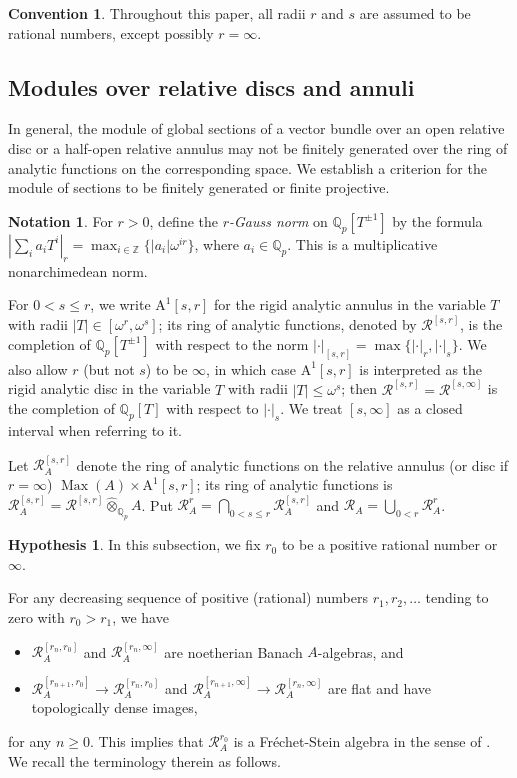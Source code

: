 \documentclass[12pt]{article}
\theoremstyle{definition}
\newtheorem{hypothesis}[theorem]{Hypothesis}
\newtheorem{convention}[theorem]{Convention}
\newtheorem{notation}[theorem]{Notation}
\numberwithin{equation}{theorem}
\newcommand{\calR}{\mathcal{R}}
\newcommand{\QQ}{\mathbb{Q}}
\newcommand{\ZZ}{\mathbb{Z}}
\newcommand{\rmA}{\mathrm{A}}
\def\Qp{\QQ_p}
\DeclareMathOperator{\Max}{Max}
\begin{document}
\begin{convention}
Throughout this paper, all radii $r$ and $s$ are assumed to be
rational numbers, except possibly $r=\infty$.
\end{convention}


\subsection{Modules over relative discs and annuli}
\label{S:half-open}
In general, the module of global sections of a vector bundle over an open relative disc or a half-open relative annulus may not be finitely generated over the ring of analytic functions on the corresponding space.  We establish a criterion for the module of sections to be finitely generated or finite projective.


\begin{notation}
For $r>0$, define the \emph{$r$-Gauss norm} on $\Qp[T^{\pm1}]$ by the formula $\left|\sum_i a_iT^i\right|_r = \max_{i\in\ZZ} \{|a_i| \omega^{ir}\}$, where $a_i \in \Qp$.  This is a multiplicative nonarchimedean norm.

For $0 < s \leq r$, we write $\rmA^1[s,r]$ for the rigid analytic
annulus in the variable $T$ with radii $|T| \in [\omega^r, \omega^s]$;
its ring of analytic functions, denoted by $\calR^{[s,r]}$, is the
completion of $\Qp[T^{\pm1}]$ with respect to the norm
$|\cdot|_{[s,r]} = \max\{|\cdot|_r, |\cdot|_s\}$.  We also allow $r$
(but not $s$) to be $\infty$, in which case $\rmA^1[s,r]$ is
interpreted as the rigid analytic disc in the variable $T$ with radii
$|T| \leq \omega^s$; then $\calR^{[s,r]} = \calR^{[s, \infty]}$ is the
completion of $\Qp[T]$ with respect to $|\cdot|_s$.  We treat
$[s,\infty]$ as a closed interval when referring to it.

Let $\calR_A^{[s,r]}$ denote the ring of analytic functions on the relative annulus (or disc if $r=\infty$) $\Max(A) \times \rmA^1[s,r]$; its ring of analytic functions is $\calR_A^{[s,r]} = \calR^{[s,r]} \widehat \otimes_{\Qp} A$.
Put $\calR^r_A = \bigcap_{0 < s \leq r} \calR^{[s,r]}_A$ and 
$\calR_A = \bigcup_{0<r} \calR^r_A$.
\end{notation}

\begin{hypothesis}
In this subsection, we fix $r_0$ to be a positive rational number or $\infty$.
\end{hypothesis}

For any decreasing sequence of positive (rational) numbers $r_1, r_2, \dots$ tending to zero with $r_0 > r_1$, we have
\begin{itemize}
\item[(i)] $\calR_A^{[r_n,r_0]}$ and $\calR_A^{[r_n,\infty]}$ are noetherian Banach $A$-algebras, and
\item[(ii)] $\calR_A^{[r_{n+1},r_0]} \to \calR_A^{[r_n,r_0]}$ and $\calR_A^{[r_{n+1},\infty]} \to \calR_A^{[r_n,\infty]}$ are flat and have topologically dense images,
\end{itemize}
for any $n \geq 0$.  This implies that $\calR_A^{r_0}$ is a Fr\'echet-Stein algebra in the sense of \cite[Section~3]{schneider-teitelbaum}.  We recall the terminology therein as follows.
\end{document}
